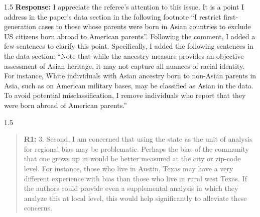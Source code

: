 \documentclass[12pt,english]{article}
\newcommand{\rrxspc}{1.5}
\begin{document}
\begin{refsection}
    \begin{spacing}{\rrxspc}
        \textbf{Response:} I appreciate the referee's attention to this issue. It is a point I address in the paper's data section in the following footnote ``I restrict first-generation cases to those whose parents were born in Asian countries to exclude US citizens born abroad to American parents''. Following the comment, I added a few sentences to clarify this point. Specifically, I added the following sentences in the data section: ``Note that while the ancestry measure provides an objective assessment of Asian heritage, it may not capture all nuances of racial identity. For instance, White individuals with Asian ancestry born to non-Asian parents in Asia, such as on American military bases, may be classified as Asian in the data. To avoid potential misclassification, I remove individuals who report that they were born abroad of American parents.''
    \end{spacing}

    \begin{spacing}{\rrxspc}
        \begin{quotation}
            \textbf{R1: } 3. Second, I am concerned that using the state as the unit of analysis for regional bias may be problematic. Perhaps the bias of the community that one grows up in would be better measured at the city or zip-code level. For instance, those who live in Austin, Texas may have a very different experience with bias than those who live in rural west Texas. If the authors could provide even a supplemental analysis in which they analyze this at local level, this would help significantly to alleviate these concerns.
    \end{quotation}
        \end{spacing}
            

\end{refsection}
\end{document}
